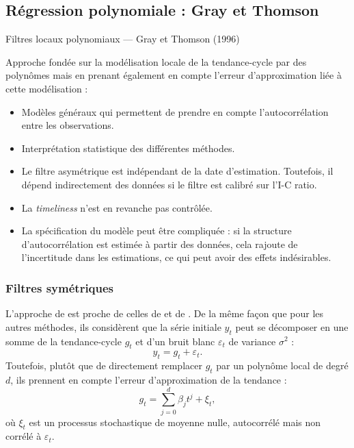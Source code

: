\documentclass[
  12pt,
  a4paper,french]{article}
\newcommand\1{\mathds{1}}
\begin{document}
\hypertarget{subsec-graythomson}{%
\subsection{Régression polynomiale : Gray et Thomson}\label{subsec-graythomson}}

\begin{summary_box}{Filtres locaux polynomiaux --- Gray et Thomson (1996)}

Approche fondée sur la modélisation locale de la tendance-cycle par des polynômes mais en prenant également en compte l'erreur d'approximation liée à cette modélisation :

\begin{itemize}
\item
  Modèles généraux qui permettent de prendre en compte l'autocorrélation entre les observations.
\item
  Interprétation statistique des différentes méthodes.
\item
  Le filtre asymétrique est indépendant de la date d'estimation.
  Toutefois, il dépend indirectement des données si le filtre est calibré sur l'I-C ratio.
\item
  La \emph{timeliness} n'est en revanche pas contrôlée.
\item
  La spécification du modèle peut être compliquée : si la structure d'autocorrélation est estimée à partir des données, cela rajoute de l'incertitude dans les estimations, ce qui peut avoir des effets indésirables.
\end{itemize}

\end{summary_box}

\hypertarget{filtres-symuxe9triques-1}{%
\subsubsection{Filtres symétriques}\label{filtres-symuxe9triques-1}}

L'approche de \textcite{GrayThomson1996} est proche de celles de \textcite{proietti2008} et de \textcite{ch15HBSA}.
De la même façon que pour les autres méthodes, ils considèrent que la série initiale \(y_t\) peut se décomposer en une somme de la tendance-cycle \(g_t\) et d'un bruit blanc \(\varepsilon_t\) de variance \(\sigma^2\) :
\[y_t = g_t+\varepsilon_t.\]
Toutefois, plutôt que de directement remplacer \(g_t\) par un polynôme local de degré \(d\), ils prennent en compte l'erreur d'approximation de la tendance :
\[
g_t=\sum_{j=0}^{d}\beta_{j}t^{j}+\xi_{t},
\]
où \(\xi_t\) est un processus stochastique de moyenne nulle, autocorrélé mais non corrélé à \(\varepsilon_t\).
\end{document}
